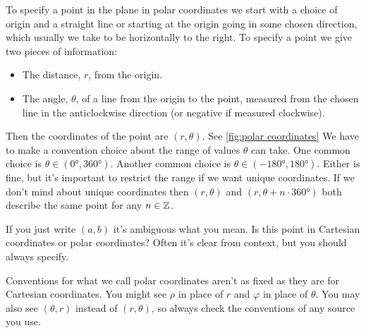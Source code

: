 \documentclass[fleqn]{LectureClass/LectureClass}
\begin{document}
    To specify a point in the plane in polar coordinates we start with a choice of origin and a straight line or  starting at the origin going in some chosen direction, which usually we take to be horizontally to the right.
    To specify a point we give two pieces of information:
    \begin{itemize}
        \item The distance, \(r\), from the origin.
        \item The angle, \(\theta\), of a line from the origin to the point, measured from the chosen line in the anticlockwise direction (or negative if measured clockwise).
    \end{itemize}
    Then the coordinates of the point are \((r, \theta)\).
    See \cref{fig:polar coordinates}
    We have to make a convention choice about the range of values \(\theta\) can take.
    One common choice is \(\theta \in (\ang{0}, \ang{360})\).
    Another common choice is \(\theta \in (-\ang{180}, \ang{180})\).
    Either is fine, but it's important to restrict the range if we want unique coordinates.
    If we don't mind about unique coordinates then \((r, \theta)\) and \((r, \theta + n \cdot \ang{360})\) both describe the same point for any \(n \in \mathbb{Z}\).
    
    \begin{wrn}
        If you just write \((a, b)\) it's ambiguous what you mean.
        Is this point in Cartesian coordinates or polar coordinates?
        Often it's clear from context, but you should always specify.
    \end{wrn}
    
    \begin{wrn}
        Conventions for what we call polar coordinates aren't as fixed as they are for Cartesian coordinates.
        You might see \(\rho\) in place of \(r\) and \(\varphi\) in place of \(\theta\).
        You may also see \((\theta, r)\) instead of \((r, \theta)\), so always check the conventions of any source you use.
    \end{wrn}
    
\end{document}
